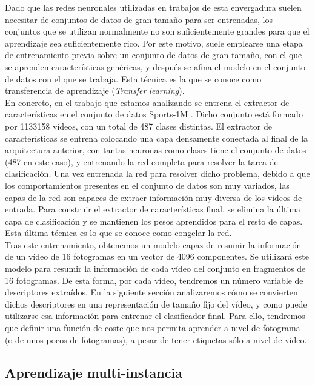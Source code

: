 \documentclass[../main.tex]{memoir}
\begin{document}
Dado que las redes neuronales utilizadas en trabajos de esta
envergadura suelen necesitar de conjuntos de datos de gran tamaño para
ser entrenadas, los conjuntos que se utilizan normalmente no son
suficientemente grandes para que el aprendizaje sea suficientemente
rico. Por este motivo, suele emplearse una etapa de entrenamiento
previa sobre un conjunto de datos de gran tamaño, con el que se
aprenden características genéricas, y después se afina el modelo en el
conjunto de datos con el que se trabaja. Esta técnica es la que se
conoce como transferencia de aprendizaje (\textit{Transfer learning}).\\

En concreto, en el trabajo que estamos analizando se entrena el
extractor de características en el conjunto de datos Sports-1M
\cite{karpathy2014large}. Dicho conjunto está formado por 1133158
vídeos, con un total de 487 clases distintas. El extractor de
características se entrena colocando una capa densamente conectada al
final de la arquitectura anterior, con tantas neuronas como clases
tiene el conjunto de datos (487 en este caso), y entrenando la red
completa para resolver la tarea de clasificación. Una vez entrenada la
red para resolver dicho problema, debido a que los comportamientos
presentes en el conjunto de datos son muy variados, las capas de la
red son capaces de extraer información muy diversa de los vídeos de
entrada. Para construir el extractor de características final, se
elimina la última capa de clasificación y se mantienen los pesos
aprendidos para el resto de capas. Esta última técnica es lo que
se conoce como congelar la red.\\

Tras este entrenamiento, obtenemos un modelo capaz de resumir la
información de un vídeo de 16 fotogramas en un vector de 4096
componentes. Se utilizará este modelo para resumir la información de
cada vídeo del conjunto en fragmentos de 16 fotogramas. De esta forma,
por cada vídeo, tendremos un número variable de descriptores
extraídos. En la siguiente sección analizaremos cómo se convierten
dichos descriptores en una representación de tamaño fijo del vídeo, y
como puede utilizarse esa información para entrenar el clasificador
final. Para ello, tendremos que definir una función de coste que nos
permita aprender a nivel de fotograma (o de unos pocos de fotogramas),
a pesar de tener etiquetas sólo a nivel de vídeo.

\subsection{Aprendizaje multi-instancia}
\end{document}
